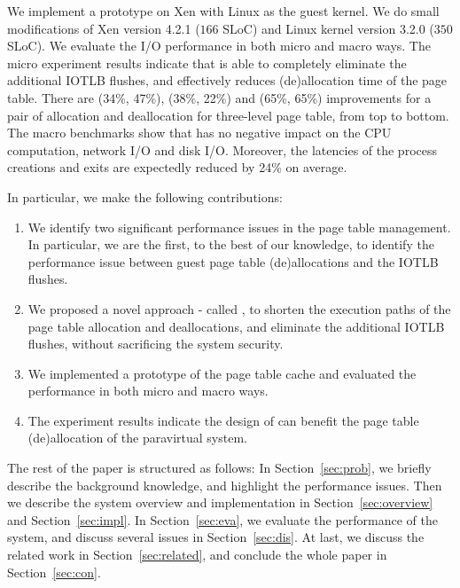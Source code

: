 We implement a prototype on Xen with Linux as the guest kernel. We do small modifications of Xen version 4.2.1 ($166$ SLoC) and Linux kernel version 3.2.0 ($350$ SLoC).
We evaluate the I/O performance in both micro and macro ways.
The micro experiment results indicate that \name is able to completely eliminate the additional IOTLB flushes, and effectively reduces (de)allocation time of the page table.
There are (34\%, 47\%), (38\%, 22\%) and (65\%, 65\%) improvements for a pair of allocation and deallocation for three-level page table, from top to bottom.
The macro benchmarks show that \name has no negative impact on the CPU computation, network I/O and disk I/O.
Moreover, the latencies of the process creations and exits are expectedly reduced by 24\% on average.

In particular, we make the following contributions:
\begin{enumerate}
\item We identify two significant performance issues in the page table management. In particular, we are the first, to the best of our knowledge, to identify the performance issue between guest page table (de)allocations and the IOTLB flushes.
\item We proposed a novel approach - called \name, to shorten the execution paths of the page table allocation and deallocations, and eliminate the additional IOTLB flushes, without sacrificing the system security.
\item We implemented a prototype of the page table cache and evaluated the performance in both micro and macro ways.
\item The experiment results indicate the design of \name can benefit the page table (de)allocation of the paravirtual system.
\end{enumerate}

The rest of the paper is structured as follows: In Section~\ref{sec:prob}, we briefly describe the background knowledge, and highlight the performance issues. Then we describe the system overview and implementation in Section~\ref{sec:overview} and Section~\ref{sec:impl}. In Section~\ref{sec:eva}, we evaluate the performance of the \name system, and discuss several issues in Section~\ref{sec:dis}. At last, we discuss the related work in Section~\ref{sec:related}, and conclude the whole paper in Section~\ref{sec:con}.

